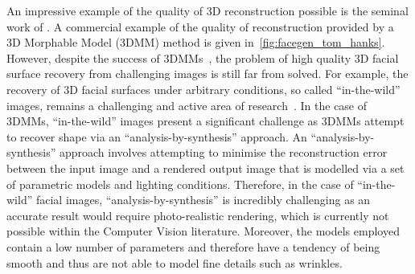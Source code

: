 An impressive example of the quality of 3D reconstruction possible is the
seminal work of \citet{RefWorks:96}. A commercial example of the
quality of reconstruction provided by a 3D Morphable Model (3DMM) method
is given in~\cref{fig:facegen_tom_hanks}. However, despite the success of 
3DMMs~\cite{RefWorks:96}, the problem of high quality 3D facial 
surface recovery from challenging images is still far from solved. For example,
the recovery of 3D facial surfaces under arbitrary conditions,
so called ``in-the-wild'' images, remains a challenging and active area of
research~\cite{KemelmacherShlizerman:2013iv,Suwajanakorn:2015gf,Suwajanakorn:2014bl,Snape:2015gl,roth2015unconstrained}.
In the case of 3DMMs, ``in-the-wild'' images present a significant challenge
as 3DMMs attempt to recover shape via an ``analysis-by-synthesis'' approach. An
``analysis-by-synthesis'' approach involves attempting to minimise the 
reconstruction error between the input image and a rendered output image that
is modelled via a set of parametric models and lighting conditions. Therefore,
in the case of ``in-the-wild'' facial images, ``analysis-by-synthesis'' is
incredibly challenging as an accurate result would require photo-realistic
rendering, which is currently not possible within the Computer Vision
literature. Moreover, the models employed contain a low number
of parameters and therefore have a tendency of being smooth and thus are not 
able to model fine details such as wrinkles.

